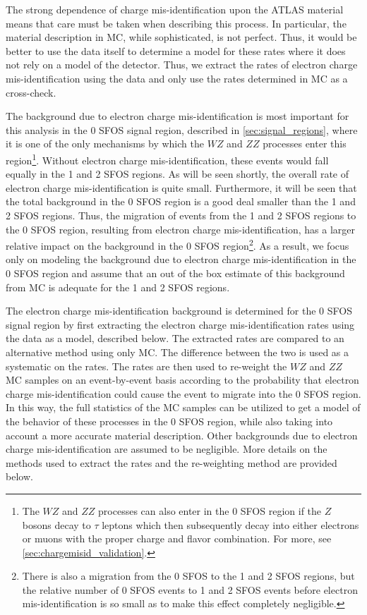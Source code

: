 The strong dependence of charge mis-identification 
upon the ATLAS material means that care must be
taken when describing this process. In particular, the material 
description in MC, while sophisticated, is not perfect. 
Thus, it would be better to use the data itself to determine
a model for these rates where it does not rely on a model of the detector.
Thus, we extract the rates of electron charge 
mis-identification using the data and only use the rates determined
in MC as a cross-check.




The background due to electron charge mis-identification is most important 
for this analysis
in the 0 SFOS signal region, described in \sec\ref{sec:signal_regions},
where it is one of the only mechanisms by which the $WZ$ and $ZZ$ 
processes enter this region\footnote{The $WZ$ and $ZZ$ processes
can also enter in the 0 SFOS region if the $Z$ bosons
decay to $\tau$ leptons which then subsequently decay into 
either electrons or muons with the proper charge and flavor combination.
For more, see \sec\ref{sec:chargemisid_validation}.}.
Without electron charge mis-identification, these events would fall
equally in the 1 and 2 SFOS regions.
As will be seen shortly, the overall rate of electron charge mis-identification
is quite small. 
Furthermore, it will be seen that the total background in the 0 SFOS region is 
a good deal smaller than the 1 and 2 SFOS regions. Thus, the
migration of events from the 1 and 2 SFOS regions to the 0 SFOS 
region, resulting from electron charge mis-identification, has
a larger relative impact on the background in the 0 SFOS 
region\footnote{There is also a migration from the 0 SFOS to the 1 and 2 SFOS 
regions, but the relative number of 0 SFOS events to 1 and 2 SFOS
events before electron mis-identification is so small as to make this
effect completely negligible.}.
As a result, we focus only on modeling the background due to electron
charge mis-identification in the 0 SFOS region and assume that an 
out of the box estimate of this background from MC is adequate for the 
1 and 2 SFOS regions.


The electron charge mis-identification background is determined
for the 0 SFOS signal region by first extracting the electron charge
mis-identification rates using the data as a model,
described below. The extracted
rates are compared to an alternative method using only MC. 
The difference between the two is used as a systematic on the
rates. The rates are then used to re-weight the $WZ$ and $ZZ$ MC samples
on an event-by-event basis 
according to the probability that electron charge mis-identification
could cause the event to migrate into the 0 SFOS region. In this way, 
the full statistics of the MC samples can be utilized to get a model of
the behavior of these processes in the 0 SFOS region, while also taking 
into account a more accurate material description. Other backgrounds
due to electron charge mis-identification are assumed to be negligible.
More details on the methods used to extract the rates and the re-weighting
method are provided below.




